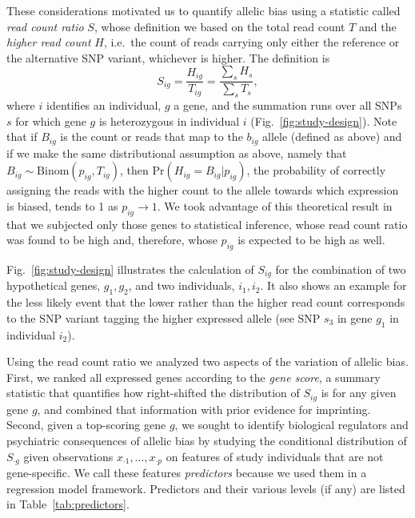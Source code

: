\documentclass[12pt,letterpaper]{article}
\begin{document}
These considerations motivated us to quantify allelic bias using a statistic called
\emph{read count ratio} \(S\), whose definition we
based on the total read count \(T\) and the \emph{higher read count} \(H\),
i.e.~the count of reads carrying only either the reference or the alternative SNP variant,
whichever is higher.  The
definition is
\begin{equation}
S_{ig} = \frac{H_{ig}}{T_{ig}}= \frac{\sum_s H_s}{\sum_sT_s},
\label{eq:S-definition}
\end{equation}
where \(i\) identifies an individual, \(g\) a gene, and the summation runs
over all SNPs \(s\) for which gene \(g\) is heterozygous in individual \(i\) (Fig.~\ref{fig:study-design}).
Note that if \(B_{ig}\) is the count or reads that map to the \(b_{ig}\) allele
(defined as above) and if we make the same distributional assumption as above, namely that \(B_{ig}\sim
\mathrm{Binom}(p_{ig}, T_{ig})\), then \(\mathrm{Pr}(H_{ig}=B_{ig}|p_{ig})\), the probability of correctly
assigning the reads with the higher count to the allele towards which
expression is biased, tends to 1 as \(p_{ig} \rightarrow 1\).  We took
advantage of this theoretical result in that we subjected only those genes to
statistical inference, whose read count ratio was found to be high and,
therefore, whose \(p_{ig}\) is expected to be high as well.

Fig.~\ref{fig:study-design} illustrates the calculation of \(S_{ig}\) for the
combination of two hypothetical genes, \(g_1,g_2\), and two individuals,
\(i_1,i_2\).  It also shows an example for the less likely event that the lower rather
than the higher read count corresponds to the SNP variant tagging the higher
expressed allele (see SNP \(s_3\) in gene \(g_1\) in individual \(i_2\)).

Using the read count ratio we analyzed two aspects of the variation of allelic
bias.  First, we ranked all expressed genes according to the \emph{gene
score}, a summary statistic that quantifies how right-shifted the distribution
of \(S_{ig}\) is for any given gene \(g\), and combined that information with
prior evidence for imprinting.  Second, given a top-scoring gene \(g\), we
sought to identify biological regulators and psychiatric consequences of
allelic bias by studying the conditional distribution of \(S_{\cdot g}\) given
observations \(x_{\cdot 1},...,x_{\cdot p}\) on features of study individuals
that are not gene-specific. We call these features \emph{predictors} because
we used them in a regression model framework.  Predictors and their various
levels (if any) are listed in Table~\ref{tab:predictors}.
\end{document}
